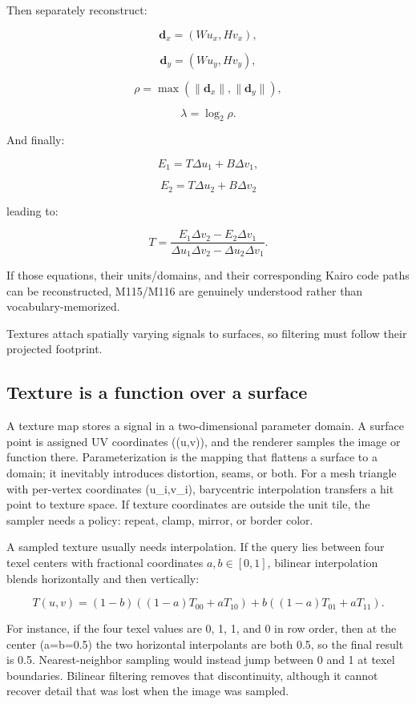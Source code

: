 Then separately reconstruct:

\[
\mathbf d_x=
(Wu_x,Hv_x),
\]

\[
\mathbf d_y=
(Wu_y,Hv_y),
\]

\[
\rho=
\max(
\|\mathbf d_x\|,
\|\mathbf d_y\|
),
\]

\[
\lambda=\log_2\rho.
\]

And finally:

\[
E_1=T\Delta u_1+B\Delta v_1,
\]

\[
E_2=T\Delta u_2+B\Delta v_2
\]

leading to:

\[
T=
\frac{
E_1\Delta v_2-E_2\Delta v_1
}{
\Delta u_1\Delta v_2-
\Delta u_2\Delta v_1
}.
\]

If those equations, their units/domains, and their corresponding Kairo code paths can be reconstructed, M115/M116 are genuinely understood rather than vocabulary-memorized.

Textures attach spatially varying signals to surfaces, so filtering must follow their projected footprint.

\subsection{Texture is a function over a surface}\label{03-visual-computing-i-ch019-texture-is-a-function-over-a-surface}

A texture map stores a signal in a two-dimensional parameter domain. A surface point is assigned UV coordinates ((u,v)), and the renderer samples the image or function there. Parameterization is the mapping that flattens a surface to a domain; it inevitably introduces distortion, seams, or both. For a mesh triangle with per-vertex coordinates (u\_i,v\_i), barycentric interpolation transfers a hit point to texture space. If texture coordinates are outside the unit tile, the sampler needs a policy: repeat, clamp, mirror, or border color.

A sampled texture usually needs interpolation. If the query lies between four texel centers with fractional coordinates \(a,b\in[0,1]\), bilinear interpolation blends horizontally and then vertically:

\[
T(u,v)=(1-b)((1-a)T_{00}+aT_{10})+b((1-a)T_{01}+aT_{11}).
\]

For instance, if the four texel values are 0, 1, 1, and 0 in row order, then at the center (a=b=0.5) the two horizontal interpolants are both 0.5, so the final result is 0.5. Nearest-neighbor sampling would instead jump between 0 and 1 at texel boundaries. Bilinear filtering removes that discontinuity, although it cannot recover detail that was lost when the image was sampled.

